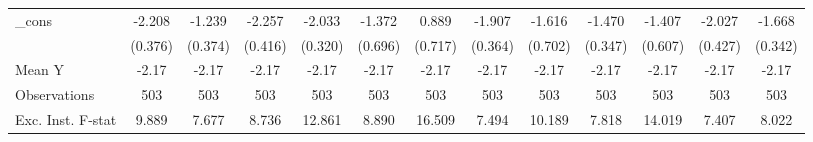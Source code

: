 {\begin{tabular}{l*{12}{c}}
\addlinespace
\_cons      &      -2.208\sym{***}&      -1.239\sym{***}&      -2.257\sym{***}&      -2.033\sym{***}&      -1.372\sym{*}  &       0.889         &      -1.907\sym{***}&      -1.616\sym{**} &      -1.470\sym{***}&      -1.407\sym{**} &      -2.027\sym{***}&      -1.668\sym{***}\\
            &     (0.376)         &     (0.374)         &     (0.416)         &     (0.320)         &     (0.696)         &     (0.717)         &     (0.364)         &     (0.702)         &     (0.347)         &     (0.607)         &     (0.427)         &     (0.342)         \\
\midrule
Mean Y      &       -2.17         &       -2.17         &       -2.17         &       -2.17         &       -2.17         &       -2.17         &       -2.17         &       -2.17         &       -2.17         &       -2.17         &       -2.17         &       -2.17         \\
Observations&         503         &         503         &         503         &         503         &         503         &         503         &         503         &         503         &         503         &         503         &         503         &         503         \\
Exc. Inst. F-stat&       9.889         &       7.677         &       8.736         &      12.861         &       8.890         &      16.509         &       7.494         &      10.189         &       7.818         &      14.019         &       7.407         &       8.022         \\
\bottomrule
\end{tabular}
}
